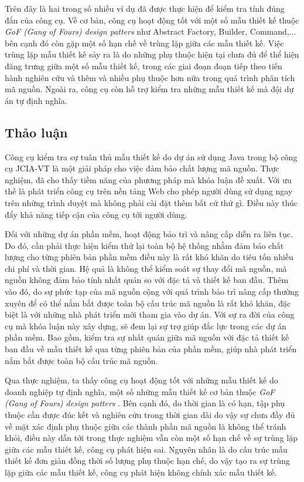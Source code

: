 \documentclass[12pt]{report}
\begin{document}
\noindent Trên đây là hai trong số nhiều ví dụ đã được thực hiện để kiểm tra tính đúng đắn của công cụ. Về cơ bản, công cụ hoạt động tốt với một số mẫu thiết kế thuộc \textit{GoF (Gang of Fours) design patters} \cite{go4} như Abstract Factory, Builder, Command,... bên cạnh đó còn gặp một số hạn chế về trùng lặp giữa các mẫu thiết kế. Việc trùng lặp mẫu thiết kế sảy ra là do những phụ thuộc hiện tại chưa đủ để thể hiện đăng trưng giữa một số mẫu thiết kế, trong các giai đoạn đoạn tiếp theo tiến hành nghiên cứu và thêm và nhiều phụ thuộc hơn nữa trong quá trình phân tích mã nguồn.
Ngoài ra, công cụ còn hỗ trợ kiểm tra những mẫu thiết kế mà đội dự án tự định nghĩa.

\subsection{Thảo luận}
Công cụ kiểm tra sự tuân thủ mẫu thiết kế do dự án sử dụng Java trong bộ công cụ JCIA-VT là một giải pháp cho việc đảm bảo chất lượng mã nguồn. Thực nghiệm, đã cho thấy tiềm năng của phương pháp mà khóa luận đề xuất. Với ưu thế là phát triển công cụ trên nền tảng Web cho phép người dùng sử dụng ngay trên những trình duyệt mà không phải cài đặt thêm bất cứ thứ gì. Điều này thúc đẩy khả năng tiếp cận của công cụ tới người dùng.

\noindent Đối với những dự án phần mềm, hoạt động bảo trì và nâng cấp diễn ra liên tục. Do đó, cần phải thực hiện kiểm thử lại toàn bộ hệ thống nhằm đảm bảo chất lượng cho từng phiên bản phần mềm điều này là rất khó khăn do tiêu tốn nhiều chi phí và thời gian. Hệ quả là không thể kiểm soát sự thay đổi mã nguồn, mã nguồn không đảm bảo tính nhất quán so với đặc tả và thiết kế ban đầu. Thêm vào đó, do sự phức tạp của mã nguồn cộng với quá trình bảo trì nâng cấp thường xuyên để có thể nắm bắt được toàn bộ cấu trúc mã nguồn là rất khó khăn, đặc biệt là với những nhà phát triển mới tham gia vào dự án. Với sự ra đời của công cụ mà khóa luận này xây dựng, sẽ đem lại sự trợ giúp đắc lực trong các dự án phần mềm. Bao gồm, kiểm tra sự nhất quán giữa mã nguồn với đặc tả thiết kế ban đầu về mẫu thiết kế qua từng phiên bản của phần mềm, giúp nhà phát triển nắm bắt được toàn bộ cấu trúc mã nguồn.

\noindent Qua thực nghiệm, ta thấy công cụ hoạt động tốt với những mẫu thiết kế do doanh nghiệp tự định nghĩa, một số những mẫu thiết kế cơ bản thuộc \textit{GoF (Gang of Fours) design patters} \cite{go4}. Bên cạnh đó, do thời gian là có hạn, tập phụ thuộc cần được đúc kết và nghiên cứu trong thời gian dài do vậy sự chưa đầy đủ về mặt xác định phụ thuộc giữa các thành phần mã nguồn là không thể tránh khỏi, điều này dẫn tới trong thực nghiệm vẫn còn một số hạn chế về sự trùng lặp giữa các mẫu thiết kế, công cụ phát hiện sai. Nguyên nhân là do cấu trúc mẫu thiết kế đơn giản đồng thời số lượng phụ thuộc hạn chế, do vậy tạo ra sự trùng lặp giữa các mẫu thiết kế, công cụ phát hiện không chính xác mẫu thiết kế.
\end{document}

